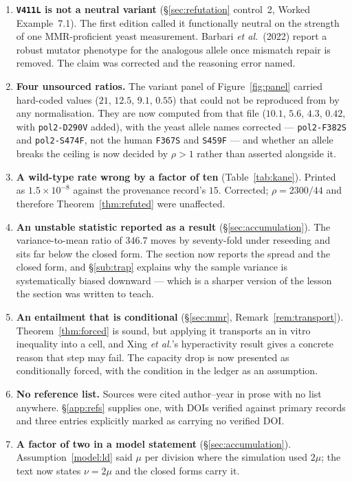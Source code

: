 \begin{enumerate}[leftmargin=*,itemsep=3pt]
  \item \textbf{\texttt{V411L} is not a neutral variant}
        (§\ref{sec:refutation} control~2, Worked Example~7.1). The first edition
        called it functionally neutral on the strength of one MMR-proficient
        yeast measurement. Barbari \emph{et al.}\ (2022) report a robust mutator
        phenotype for the analogous allele once mismatch repair is removed. The
        claim was corrected and the reasoning error named.
  \item \textbf{Four unsourced ratios.} The variant panel of
        Figure~\ref{fig:panel} carried hard-coded values ($21$, $12.5$, $9.1$,
        $0.55$) that could not be reproduced from
         by any normalisation. They
        are now computed from that file ($10.1$, $5.6$, $4.3$, $0.42$, with
        \texttt{pol2-D290V} added), with the yeast allele names corrected ---
        \texttt{pol2-F382S} and \texttt{pol2-S474F}, not the human
        \texttt{F367S} and \texttt{S459F} --- and whether an allele breaks the
        ceiling is now decided by $\rho > 1$ rather than asserted alongside it.
  \item \textbf{A wild-type rate wrong by a factor of ten}
        (Table~\ref{tab:kane}). Printed as $1.5\times10^{-8}$ against the
        provenance record's $15$. Corrected; $\rho = 2300/44$ and therefore
        Theorem~\ref{thm:refuted} were unaffected.
  \item \textbf{An unstable statistic reported as a result}
        (§\ref{sec:accumulation}). The variance-to-mean ratio of $346.7$ moves
        by seventy-fold under reseeding and sits far below the closed form. The
        section now reports the spread and the closed form, and
        §\ref{sub:trap} explains why the sample variance is systematically
        biased downward --- which is a sharper version of the lesson the section
        was written to teach.
  \item \textbf{An entailment that is conditional}
        (§\ref{sec:mmr}, Remark~\ref{rem:transport}). Theorem~\ref{thm:forced}
        is sound, but applying it transports an in vitro inequality into a cell,
        and Xing \emph{et al.}'s hyperactivity result gives a concrete reason that
        step may fail. The capacity drop is now presented as conditionally
        forced, with the condition in the ledger as an assumption.
  \item \textbf{No reference list.} Sources were cited author--year in prose
        with no list anywhere. §\ref{app:refs} supplies one, with DOIs verified
        against primary records and three entries explicitly marked as carrying
        no verified DOI.
  \item \textbf{A factor of two in a model statement}
        (§\ref{sec:accumulation}). Assumption~\ref{model:ld} said $\mu$ per
        division where the simulation used $2\mu$; the text now states $\nu =
        2\mu$ and the closed forms carry it.
\end{enumerate}

